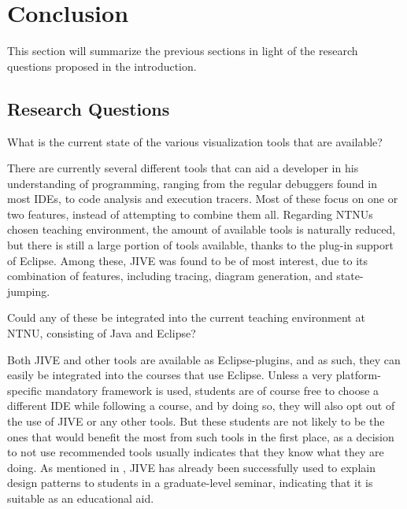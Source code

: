 \chapter{Conclusion}\label{conclusion}
This section will summarize the previous sections in light of the research questions proposed in the introduction.
\section{Research Questions}\label{conclusionRQs}


\begin{theorem}
What is the current state of the various visualization tools that are available?
\end{theorem}

There are currently several different tools that can aid a developer in his understanding of programming, ranging from the regular debuggers found in most IDEs, to code analysis and execution tracers.
Most of these focus on one or two features, instead of attempting to combine them all.
Regarding NTNUs chosen teaching environment, the amount of available tools is naturally reduced, but there is still a large portion of tools available, thanks to the plug-in support of Eclipse.
Among these, JIVE was found to be of most interest, due to its combination of features, including tracing, diagram generation, and state-jumping.
~\\

\begin{theorem}
Could any of these be integrated into the current teaching environment at NTNU, consisting of Java and Eclipse?
\end{theorem}

Both JIVE and other tools are available as Eclipse-plugins, and as such, they can easily be integrated into the courses that use Eclipse.
Unless a very platform-specific mandatory framework is used, students are of course free to choose a different IDE while following  a course, and by doing so, they will also opt out of the use of JIVE or any other tools.
But these students are not likely to be the ones that would benefit the most from such tools in the first place, as a decision to not use recommended tools usually indicates that they know what they are doing. %
As mentioned in \cite[p. 99]{Gestwicki2005}, JIVE has already been successfully used to explain design patterns to students in a graduate-level seminar, indicating that it is suitable as an educational aid.
~\\

